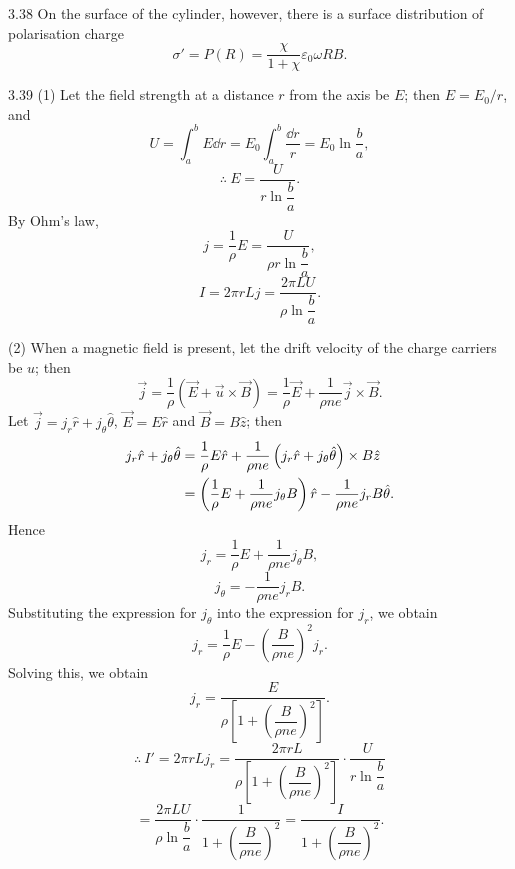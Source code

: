 \begin{solution}{3.38}
On the surface of the cylinder, however, there is a surface distribution of polarisation charge
\begin{equation}
\sigma'=P(R)=\frac{\chi}{1+\chi}\varepsilon_0\omega RB. \tag{6}
\end{equation}
\end{solution}

\begin{solution}{3.39}
(1) Let the field strength at a distance $r$ from the axis be $E$; then $E=E_0/r$, and
\[
U=\int_a^b E\dd r=E_0\int_a^b\frac{\dd r}{r}=E_0\ln\frac{b}{a},
\]
\[
\therefore\ E=\frac{U}{r\ln\dfrac{b}{a}}.
\]
By Ohm's law,
\[
j=\frac{1}{\rho}E=\frac{U}{\rho r\ln\dfrac{b}{a}},
\]
\[
I=2\pi rLj=\frac{2\pi LU}{\rho\ln\dfrac{b}{a}}.
\]

(2) When a magnetic field is present, let the drift velocity of the charge carriers be $u$; then
\[
\vec{j}=\frac{1}{\rho}\left(\vec{E}+\vec{u}\times\vec{B}\right)
=\frac{1}{\rho}\vec{E}+\frac{1}{\rho ne}\vec{j}\times\vec{B}.
\]
Let $\vec{j}=j_r\hat{r}+j_\theta\hat{\theta}$, $\vec{E}=E\hat{r}$ and $\vec{B}=B\hat{z}$; then
\begin{align}
j_r\hat{r}+j_\theta\hat{\theta}
&=\frac{1}{\rho}E\hat{r}+\frac{1}{\rho ne}\left(j_r\hat{r}+j_\theta\hat{\theta}\right)\times B\hat{z}\notag\\
&=\left(\frac{1}{\rho}E+\frac{1}{\rho ne}j_\theta B\right)\hat{r}
-\frac{1}{\rho ne}j_rB\hat{\theta}.\notag
\end{align}
Hence
\[
j_r=\frac{1}{\rho}E+\frac{1}{\rho ne}j_\theta B,
\]
\[
j_\theta=-\frac{1}{\rho ne}j_rB.
\]
Substituting the expression for $j_\theta$ into the expression for $j_r$, we obtain
\[
j_r=\frac{1}{\rho}E-\left(\frac{B}{\rho ne}\right)^2j_r .
\]
Solving this, we obtain
\[
j_r=\frac{E}{\rho\left[1+\left(\dfrac{B}{\rho ne}\right)^2\right]}.
\]
\[
\therefore\ I'=2\pi rLj_r
=\frac{2\pi rL}{\rho\left[1+\left(\dfrac{B}{\rho ne}\right)^2\right]}\cdot\frac{U}{r\ln\dfrac{b}{a}}
\]
\[
=\frac{2\pi LU}{\rho\ln\dfrac{b}{a}}\cdot\frac{1}{1+\left(\dfrac{B}{\rho ne}\right)^2}
=\frac{I}{1+\left(\dfrac{B}{\rho ne}\right)^2}.
\]
\end{solution}

